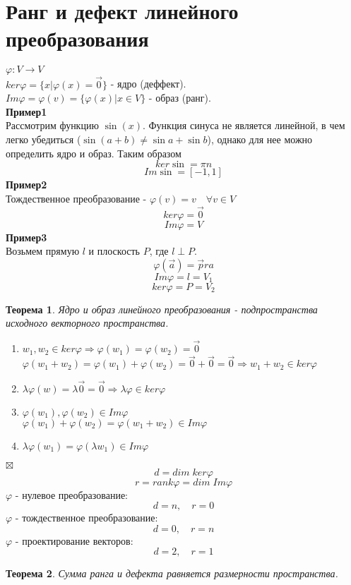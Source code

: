\documentclass[a4paper, 12pt]{report}
\newtheorem*{theorem}{Теорема}
\newenvironment{Proof}
{\par\noindent{$\blacklozenge$}}
{\hfill$\scriptstyle\boxtimes$}
\begin{document}
\section{Ранг и дефект линейного преобразования}
$\varphi:V\rightarrow V$\\
$ker \varphi = \{x|\varphi(x)=\vec 0\}$ - ядро (деффект).\\
$Im \varphi = \varphi(v)=\{\varphi(x)|x \in V\}$ - образ (ранг).\\
\textbf{Пример1}\\
Рассмотрим функцию $\sin(x)$. Функция синуса не является линейной, в чем легко убедиться ($\sin(a+b) \neq \sin a + \sin b$), однако для нее можно определить ядро и образ. Таким образом
$$ker \sin = {\pi n}$$
$$Im \sin = [-1,1]$$
\textbf{Пример2}\\
Тождественное преобразование - $\varphi(v)=v \quad \forall v \in V$
$$ker \varphi = \vec 0$$
$$Im \varphi = V$$
\textbf{Пример3}\\
Возьмем прямую $l$ и плоскость $P$, где $l \perp P$.
$$\varphi(\vec a)=\vec pr a$$
$$Im \varphi = l = V_1$$
$$ker \varphi = P = V_2$$
\begin{theorem}
    Ядро и образ линейного преобразования - подпространства исходного векторного пространства.
\end{theorem}
\begin{Proof}
   \begin{enumerate}
       \item $w_1,w_2 \in ker \varphi \Rightarrow \varphi(w_1)=\varphi(w_2)=\vec 0$
       $\varphi(w_1+w_2)=\varphi(w_1)+\varphi(w_2)=\vec 0+ \vec 0=\vec 0 \Rightarrow w_1+w_2 \in ker \varphi$
       \item $\lambda \varphi(w)=\lambda \vec 0=\vec 0 \Rightarrow \lambda \varphi \in ker \varphi$
       \item $\varphi(w_1),\varphi(w_2) \in Im \varphi$\\
       $\varphi(w_1)+\varphi(w_2)=\varphi(w_1+w_2) \in Im \varphi$
       \item $\lambda \varphi(w_1)=\varphi(\lambda w_1) \in Im \varphi$
   \end{enumerate}
\end{Proof}
$$d = dim \; ker \varphi$$
$$r = rank \varphi = dim \; Im \varphi$$
$\varphi$ - нулевое преобразование:
$$d=n, \quad r=0$$
$\varphi$ - тождественное преобразование:
$$d=0, \quad r=n$$
$\varphi$ - проектирование векторов:
$$d=2, \quad r=1$$
\begin{theorem}
    Сумма ранга и дефекта равняется размерности пространства.
\end{theorem}
\end{document}

